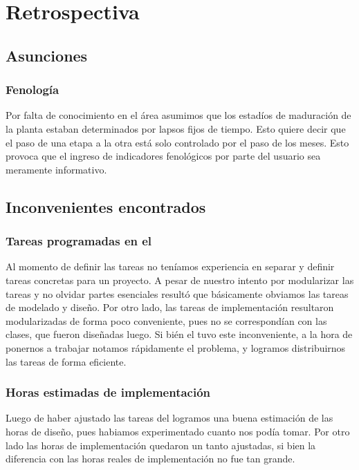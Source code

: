 \section{Retrospectiva}

  \subsection{Asunciones}
    \subsubsection{Fenolog\'ia}
      Por falta de conocimiento en el \'area asumimos que los estad\'ios de maduraci\'on
      de la planta estaban determinados por lapsos fijos de tiempo. Esto quiere decir que
      el paso de una etapa a la otra est\'a solo controlado por el paso de los meses. 
      Esto provoca que el ingreso de indicadores fenol\'ogicos por parte del usuario
      sea meramente informativo.  

  \subsection{Inconvenientes encontrados}
    \subsubsection{Tareas programadas en el \sprintback{}}
      Al momento de definir las tareas no ten\'iamos experiencia en separar y definir
      tareas concretas para un proyecto. A pesar de nuestro intento por modularizar
      las tareas y no olvidar partes esenciales result\'o que b\'asicamente obviamos
      las tareas de modelado y dise\~no. Por otro lado, las tareas de implementaci\'on
      resultaron modularizadas de forma poco conveniente, pues no se correspond\'ian
      con las clases, que fueron dise\~nadas luego. Si bi\'en el \sprintback{} tuvo
      este inconveniente, a la hora de ponernos a trabajar notamos r\'apidamente
      el problema, y logramos distribuirnos las tareas de forma eficiente.
    \subsubsection{Horas estimadas de implementaci\'on}
      Luego de haber ajustado las tareas del \sprintback{} logramos una buena
      estimaci\'on de las horas de dise\~no, pues habiamos experimentado cuanto
      nos pod\'ia tomar. Por otro lado las horas de implementaci\'on quedaron un tanto
      ajustadas, si bien la diferencia con las horas reales de implementaci\'on no
      fue tan grande.

